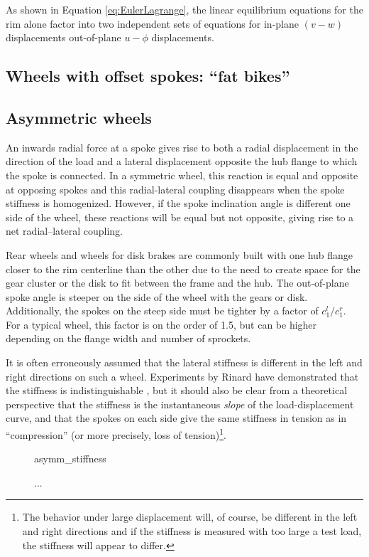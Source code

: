 \documentclass[\rootdir/thesis.tex]{subfiles}
\begin{document}
As shown in Equation \eqref{eq:EulerLagrange}, the linear equilibrium equations for the rim alone factor into two independent sets of equations for in-plane $(v-w)$ displacements out-of-plane $u-\phi$ displacements. 

\subsection{Wheels with offset spokes: ``fat bikes''}



\subsection{Asymmetric wheels}

An inwards radial force at a spoke gives rise to both a radial displacement in the direction of the load and a lateral displacement opposite the hub flange to which the spoke is connected. In a symmetric wheel, this reaction is equal and opposite at opposing spokes and this radial-lateral coupling disappears when the spoke stiffness is homogenized. However, if the spoke inclination angle is different one side of the wheel, these reactions will be equal but not opposite, giving rise to a net radial--lateral coupling.

Rear wheels and wheels for disk brakes are commonly built with one hub flange closer to the rim centerline than the other due to the need to create space for the gear cluster or the disk to fit between the frame and the hub. The out-of-plane spoke angle is steeper on the side of the wheel with the gears or disk. Additionally, the spokes on the steep side must be tighter by a factor of $c_1^l/c_1^r$. For a typical wheel, this factor is on the order of 1.5, but can be higher depending on the flange width and number of sprockets.

It is often erroneously assumed that the lateral stiffness is different in the left and right directions on such a wheel. Experiments by Rinard have demonstrated that the stiffness is indistinguishable \cite{Rinard}, but it should also be clear from a theoretical perspective that the stiffness is the instantaneous \emph{slope} of the load-displacement curve, and that the spokes on each side give the same stiffness in tension as in ``compression'' (or more precisely, loss of tension)\footnote{The behavior under large displacement will, of course, be different in the left and right directions and if the stiffness is measured with too large a test load, the stiffness will appear to differ.}.

\begin{figure}
\centering
{asymm_stiffness}
\caption{...}
\label{fig:asymm_wheel}
\end{figure}
\end{document}
